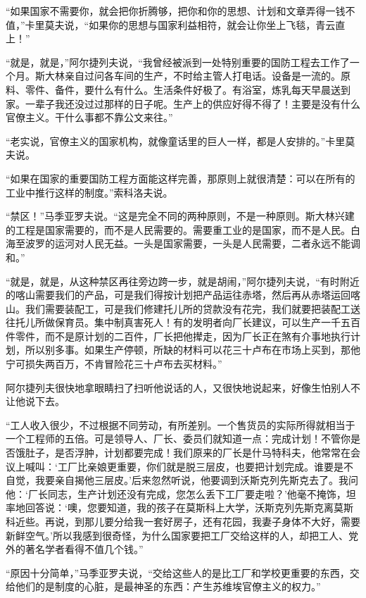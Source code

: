“如果国家不需要你，就会把你折腾够，把你和你的思想、计划和文章弄得一钱不值，”卡里莫夫说，“如果你的思想与国家利益相符，就会让你坐上飞毯，青云直上！”

“就是，就是，”阿尔捷列夫说，“我曾经被派到一处特别重要的国防工程去工作了一个月。斯大林亲自过问各车间的生产，不时给主管人打电话。设备是一流的。原料、零件、备件，要什么有什么。生活条件好极了。有浴室，炼乳每天早晨送到家。一辈子我还没过过那样的日子呢。生产上的供应好得不得了！主要是没有什么官僚主义。干什么事都不靠公文来往。”

“老实说，官僚主义的国家机构，就像童话里的巨人一样，都是人安排的。”卡里莫夫说。

“如果在国家的重要国防工程方面能这样完善，那原则上就很清楚：可以在所有的工业中推行这样的制度。”索科洛夫说。

“禁区！”马季亚罗夫说。“这是完全不同的两种原则，不是一种原则。斯大林兴建的工程是国家需要的，而不是人民需要的。需要重工业的是国家，而不是人民。白海至波罗的运河对人民无益。一头是国家需要，一头是人民需要，二者永远不能调和。”

“就是，就是，从这种禁区再往旁边跨一步，就是胡闹，”阿尔捷列夫说，“有时附近的喀山需要我们的产品，可是我们得按计划把产品运往赤塔，然后再从赤塔运回喀山。我们需要装配工，可是我们修建托儿所的贷款没有花完，我们就要把装配工送往托儿所做保育员。集中制真害死人！有的发明者向厂长建议，可以生产一千五百件零件，而不是原计划的二百件，厂长把他撵走，因为厂长正在煞有介事地执行计划，所以别多事。如果生产停顿，所缺的材料可以花三十卢布在市场上买到，那他宁可损失两百万，不肯冒险花三十卢布去买材料。”

阿尔捷列夫很快地拿眼睛扫了扫听他说话的人，又很快地说起来，好像生怕别人不让他说下去。

“工人收入很少，不过根据不同劳动，有所差别。一个售货员的实际所得就相当于一个工程师的五倍。可是领导人、厂长、委员们就知道一点：完成计划！不管你是否饿肚子，是否浮肿，计划都要完成！我们原来的厂长是什马特科夫，他常常在会议上喊叫：‘工厂比亲娘更重要，你们就是脱三层皮，也要把计划完成。谁要是不自觉，我要亲自揭他三层皮。’后来忽然听说，他要调到沃斯克列先斯克去了。我问他：‘厂长同志，生产计划还没有完成，您怎么丢下工厂要走啦？’他毫不掩饰，坦率地回答说：‘噢，您要知道，我的孩子在莫斯科上大学，沃斯克列先斯克离莫斯科近些。再说，到那儿要分给我一套好房子，还有花园，我妻子身体不大好，需要新鲜空气。’所以我感到很奇怪，为什么国家要把工厂交给这样的人，却把工人、党外的著名学者看得不值几个钱。”

“原因十分简单，”马季亚罗夫说，“交给这些人的是比工厂和学校更重要的东西，交给他们的是制度的心脏，是最神圣的东西：产生苏维埃官僚主义的权力。”

